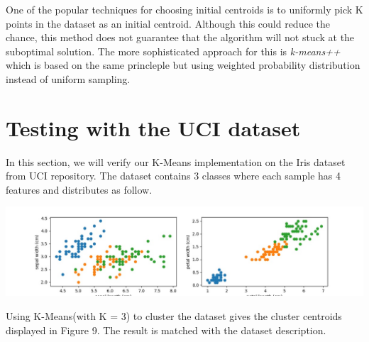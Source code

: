 \documentclass{article}
\begin{document}
One of the popular techniques for choosing initial centroids is to uniformly pick K points in the dataset as an initial centroid. Although this could reduce the chance, this method does not guarantee that the algorithm will not stuck at the suboptimal solution. The more sophisticated approach for this is \textit{k-means++}\cite{kmpp} which is based on the same princleple but using weighted probability distribution instead of uniform sampling.

\section{Testing with the UCI dataset}
In this section, we will verify our K-Means implementation on the Iris dataset from UCI repository. The dataset contains 3 classes where each sample has 4 features and distributes as follow.
\begin{center}
\includegraphics[scale=0.3]{iris_dist}
\end{center}
Using K-Means(with K = 3) to cluster the dataset gives the cluster centroids displayed in Figure 9. The result is matched with the dataset description.
\end{document}
